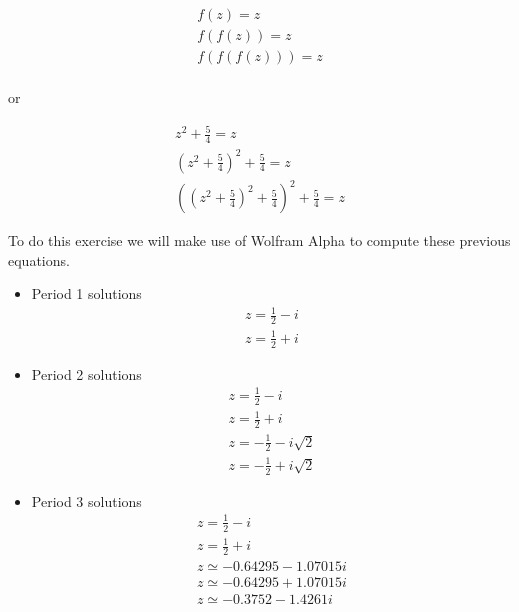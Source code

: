 \documentclass[11pt]{article}
\begin{document}
\begin{equation}
    \begin{aligned}
    f(z) = z\\
    f(f(z)) = z\\
    f(f(f(z))) = z\\
    \end{aligned}
\end{equation}

\begin{center}
or
\end{center}

\begin{equation}
    \begin{gathered}
        z^2 + \frac{5}{4} = z\\
        (z^2 + \frac{5}{4})^2 + \frac{5}{4} = z\\
        ((z^2 + \frac{5}{4})^2 + \frac{5}{4})^2 +\frac{5}{4} = z
    \end{gathered}
\end{equation}

To do this exercise we will make use of Wolfram Alpha to compute these previous equations.

\begin{itemize}
    \item Period 1 solutions
    \begin{equation}
        \begin{gathered}
        z = \frac{1}{2} - i\\
        z = \frac{1}{2} + i
        \end{gathered}
    \end{equation}

    \item Period 2 solutions
    \begin{equation}
        \begin{gathered}
        z = \frac{1}{2} - i\\
        z = \frac{1}{2} + i\\
        z = -\frac{1}{2} - i \sqrt{2}\\
        z = -\frac{1}{2} + i \sqrt{2}
        \end{gathered}
    \end{equation}

    \item Period 3 solutions
    \begin{equation}
        \begin{gathered}
        z = \frac{1}{2} - i\\
        z = \frac{1}{2} + i\\
        z \simeq -0.64295 - 1.07015 i\\
        z \simeq -0.64295 + 1.07015 i\\
        z\simeq -0.3752 - 1.4261 i
        \end{gathered}
    \end{equation}
\end{itemize}
\end{document}
